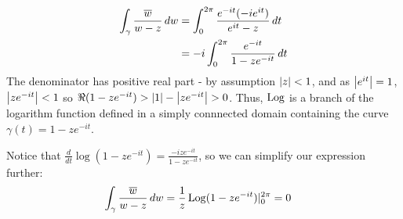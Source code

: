 \documentclass{homework}
\begin{document}
                                                                                                  \begin{solution}
                                                                                                  \begin{align*}
                                                                                                      \int_\gamma \frac{\overline{w}}{w - z} \, dw &=
                                                                                                          \int_0^{2\pi} \frac{e^{-it}(-ie^{it})}{e^{it} - z} \, dt\\
                                                                                                              &= -i\int_0^{2\pi} \frac{e^{-it}}{1 - ze^{-it}} \, dt
                                                                                                              \end{align*}
                                                                                                              The denominator has positive real part - by assumption $\left|z\right|< 1$, and as $\left|e^{it}\right| =1$, $\left|ze^{-it}\right|  < 1$ so $\Re(1-ze^{-it}) > \left|1\right| - \left|ze^{-it}\right| > 0$. Thus, $\operatorname{Log}$ is a branch of the logarithm function defined in a simply connnected domain containing the curve $\gamma(t) = 1-ze^{-it}$.

                                                                                                              Notice that $\frac{d}{dt}\log(1-ze^{-it}) = \frac{-ize^{-it}}{1-ze^{-it}}$, so we can simplify our expression further:
                                                                                                              \begin{align*}
                                                                                                                  \int_\gamma \frac{\overline{w}}{w - z} \, dw &=
                                                                                                                      \frac{1}{z}\operatorname{Log}(1 - ze^{-it})|_0^{2\pi} = 0
                                                                                                                      \end{align*}

                                                                                                                      \end{solution}
\end{document}
